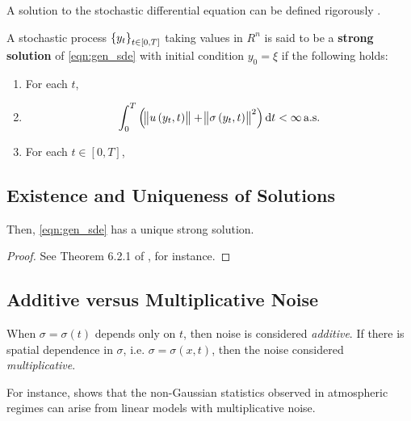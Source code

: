 A solution to the stochastic differential equation can be defined rigorously \cite{KallianpurSundar_2014_StochasticAnalysisDiffusion}.
\begin{defn}
	A stochastic process \(\set{y_t}_{t \in [0,T]}\) taking values in \(R^n\) is said to be a \textbf{strong solution} of \eqref{eqn:gen_sde} with initial condition \(y_0 = \xi\) if the following holds:
	\begin{enumerate}
		\item For each \(t\),
		\item
		      \[
			      \int_0^T{\left(\norm{u\left(y_t, t\right)} + \norm{\sigma\left(y_t, t\right)}^2\right)\dif t} < \infty \alsu
		      \]

		\item For each \(t \in [0,T]\),
	\end{enumerate}
\end{defn}


\subsection{Existence and Uniqueness of Solutions}

\begin{theorem}

	Then, \eqref{eqn:gen_sde} has a unique strong solution.
\end{theorem}
\begin{proof}
	See Theorem 6.2.1 of \cite{KallianpurSundar_2014_StochasticAnalysisDiffusion}, for instance.
\end{proof}


\subsection{Additive versus Multiplicative Noise}

When \(\sigma = \sigma(t)\) depends only on \(t\), then noise is considered \emph{additive}.
If there is spatial dependence in \(\sigma\), i.e. \(\sigma = \sigma(x,t)\), then the noise considered \emph{multiplicative}.



For instance, \cite{SuraEtAl_2005_MultiplicativeNoiseNonGaussianity} shows that the non-Gaussian statistics observed in atmospheric regimes can arise from linear models with multiplicative noise.





